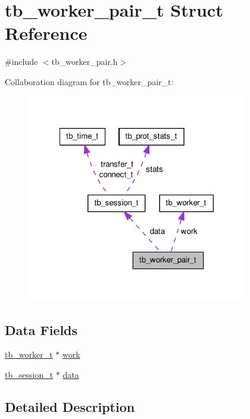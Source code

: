 \hypertarget{structtb__worker__pair__t}{\section{tb\-\_\-worker\-\_\-pair\-\_\-t Struct Reference}
\label{structtb__worker__pair__t}
}


{\ttfamily \#include $<$tb\-\_\-worker\-\_\-pair.\-h$>$}



Collaboration diagram for tb\-\_\-worker\-\_\-pair\-\_\-t\-:\nopagebreak
\begin{figure}[H]
\begin{center}
\leavevmode
\includegraphics[width=273pt]{structtb__worker__pair__t__coll__graph}
\end{center}
\end{figure}
\subsection*{Data Fields}
\begin{DoxyCompactItemize}
\item 
\hyperlink{structtb__worker__t}{tb\-\_\-worker\-\_\-t} $\ast$ \hyperlink{structtb__worker__pair__t_a251992dcf5d5af0421eb260017a00b2a}{work}
\item 
\hyperlink{structtb__session__t}{tb\-\_\-session\-\_\-t} $\ast$ \hyperlink{structtb__worker__pair__t_a1c1dc2e9642e013fcac80a215230478a}{data}
\end{DoxyCompactItemize}


\subsection{Detailed Description}


